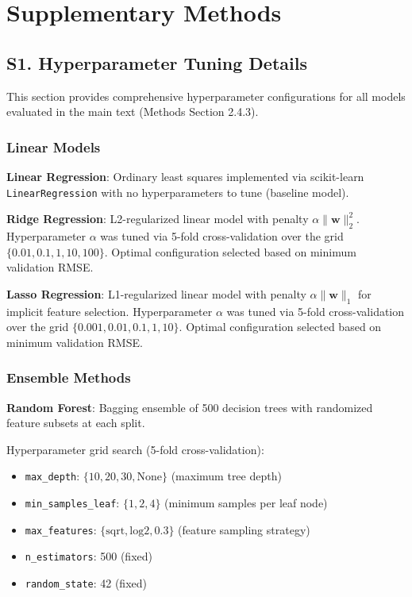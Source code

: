 \documentclass[11pt]{article}
\begin{document}
\clearpage

\section*{Supplementary Methods}

\subsection*{S1. Hyperparameter Tuning Details}

This section provides comprehensive hyperparameter configurations for all models evaluated in the main text (Methods Section 2.4.3).

\subsubsection*{Linear Models}

\textbf{Linear Regression}: Ordinary least squares implemented via scikit-learn \texttt{LinearRegression} with no hyperparameters to tune (baseline model).

\textbf{Ridge Regression}: L2-regularized linear model with penalty $\alpha\|\mathbf{w}\|_2^2$. Hyperparameter $\alpha$ was tuned via 5-fold cross-validation over the grid $\{0.01, 0.1, 1, 10, 100\}$. Optimal configuration selected based on minimum validation RMSE.

\textbf{Lasso Regression}: L1-regularized linear model with penalty $\alpha\|\mathbf{w}\|_1$ for implicit feature selection. Hyperparameter $\alpha$ was tuned via 5-fold cross-validation over the grid $\{0.001, 0.01, 0.1, 1, 10\}$. Optimal configuration selected based on minimum validation RMSE.

\subsubsection*{Ensemble Methods}

\textbf{Random Forest}: Bagging ensemble of 500 decision trees with randomized feature subsets at each split.

Hyperparameter grid search (5-fold cross-validation):
\begin{itemize}
    \item \texttt{max\_depth}: $\{10, 20, 30, \text{None}\}$ (maximum tree depth)
    \item \texttt{min\_samples\_leaf}: $\{1, 2, 4\}$ (minimum samples per leaf node)
    \item \texttt{max\_features}: $\{\text{sqrt}, \text{log2}, 0.3\}$ (feature sampling strategy)
    \item \texttt{n\_estimators}: 500 (fixed)
    \item \texttt{random\_state}: 42 (fixed)
\end{itemize}
\end{document}
